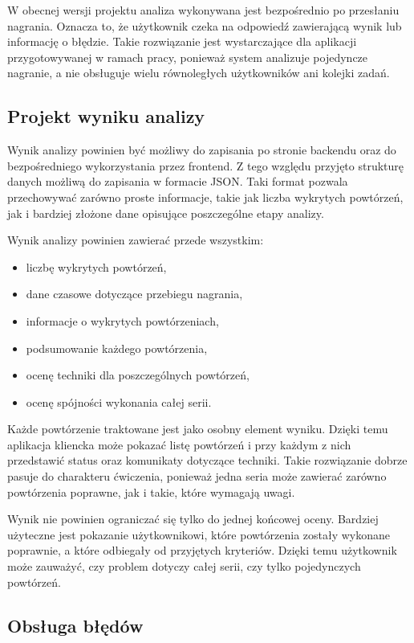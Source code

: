 W obecnej wersji projektu analiza wykonywana jest bezpośrednio po przesłaniu nagrania. Oznacza to, że użytkownik czeka na odpowiedź zawierającą wynik lub informację o błędzie. Takie rozwiązanie jest wystarczające dla aplikacji przygotowywanej w ramach pracy, ponieważ system analizuje pojedyncze nagranie, a nie obsługuje wielu równoległych użytkowników ani kolejki zadań.

\subsection{Projekt wyniku analizy}

Wynik analizy powinien być możliwy do zapisania po stronie backendu oraz do bezpośredniego wykorzystania przez frontend. Z tego względu przyjęto strukturę danych możliwą do zapisania w formacie JSON. Taki format pozwala przechowywać zarówno proste informacje, takie jak liczba wykrytych powtórzeń, jak i bardziej złożone dane opisujące poszczególne etapy analizy.

Wynik analizy powinien zawierać przede wszystkim:

\begin{itemize}
\item liczbę wykrytych powtórzeń,
\item dane czasowe dotyczące przebiegu nagrania,
\item informacje o wykrytych powtórzeniach,
\item podsumowanie każdego powtórzenia,
\item ocenę techniki dla poszczególnych powtórzeń,
\item ocenę spójności wykonania całej serii.
\end{itemize}

Każde powtórzenie traktowane jest jako osobny element wyniku. Dzięki temu aplikacja kliencka może pokazać listę powtórzeń i przy każdym z nich przedstawić status oraz komunikaty dotyczące techniki. Takie rozwiązanie dobrze pasuje do charakteru ćwiczenia, ponieważ jedna seria może zawierać zarówno powtórzenia poprawne, jak i takie, które wymagają uwagi.

Wynik nie powinien ograniczać się tylko do jednej końcowej oceny. Bardziej użyteczne jest pokazanie użytkownikowi, które powtórzenia zostały wykonane poprawnie, a które odbiegały od przyjętych kryteriów. Dzięki temu użytkownik może zauważyć, czy problem dotyczy całej serii, czy tylko pojedynczych powtórzeń.

\subsection{Obsługa błędów}

